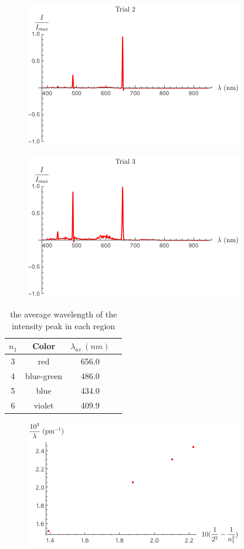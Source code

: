 \documentclass[aps,prl,preprint,groupedaddress]{revtex4-2}
\begin{document}
    \begin{figure}[h]
        \centering
		\includegraphics{res/trial2.png}
		\caption{}
    \end{figure}
    
    \begin{figure}[h]
        \centering
		\includegraphics{res/trial3.png}
		\caption{}
    \end{figure}
    
    \begin{table}[h]
        \centering
        \begin{tabular}{||c||c||c||c||} 
             \hline
             $n_1$ & Color & $\lambda_{av}~(\si{nm})$\\ [0.5ex] 
             \hline\hline
             3 & red & 656.0\\ 
             4 & blue-green & 486.0 \\
             5 & blue & 434.0 \\
             6 & violet & 409.9 \\ [1ex] 
             \hline
        \end{tabular}
        \caption{the average wavelength of the intensity peak in each region}
    \end{table}
    
    \begin{figure}[h]
        \centering
		\includegraphics{res/data.png}
		\caption{}
    \end{figure}
\clearpage
\end{document}
